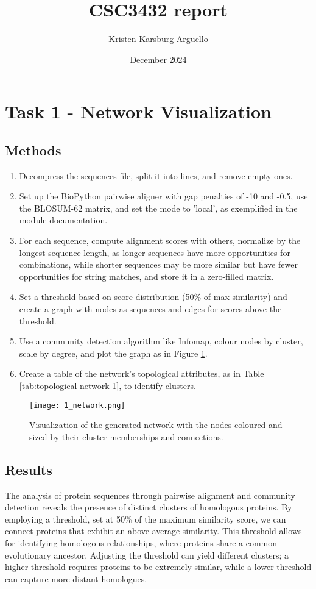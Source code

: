 \documentclass[a4paper,12pt]{article}
\title{CSC3432 report}
\author{Kristen Karsburg Arguello}
\date{December 2024}
\begin{document}
\maketitle

\section{Task 1 - Network Visualization}

\newcommand{\threshold}{50\% } 


\subsection{Methods}
\begin{enumerate}
    \item Decompress the sequences file, split it into lines, and remove empty ones.
    \item Set up the BioPython pairwise aligner with gap penalties of -10 and -0.5, use the BLOSUM-62 matrix, and set the mode to 'local', as exemplified in the module documentation.
    \item For each sequence, compute alignment scores with others, normalize by the longest sequence length, as longer sequences have more opportunities for combinations, while shorter sequences may be more similar but have fewer opportunities for string matches, and store it in a zero-filled matrix. 
    \item Set a threshold based on score distribution (\threshold of max similarity) and create a graph with nodes as sequences and edges for scores above the threshold.
    \item Use a community detection algorithm like Infomap, colour nodes by cluster, scale by degree, and plot the graph as in Figure \ref{fig:network-1}.
    \item Create a table of the network's topological attributes, as in Table \ref{tab:topological-network-1}, to identify clusters.
\end{enumerate}


\begin{figure}[h]
  \centering
  \texttt{[image: 1\_network.png]}
  \caption{Visualization of the generated network with the nodes coloured and sized by their cluster memberships and connections.}
  \label{fig:network-1}
\end{figure}


\subsection{Results}
The analysis of protein sequences through pairwise alignment and community detection reveals the presence of distinct clusters of homologous proteins. By employing a threshold, set at \threshold of the maximum similarity score, we can connect proteins that exhibit an above-average similarity. This threshold allows for identifying homologous relationships, where proteins share a common evolutionary ancestor. Adjusting the threshold can yield different clusters; a higher threshold requires proteins to be extremely similar, while a lower threshold can capture more distant homologues.
\end{document}
